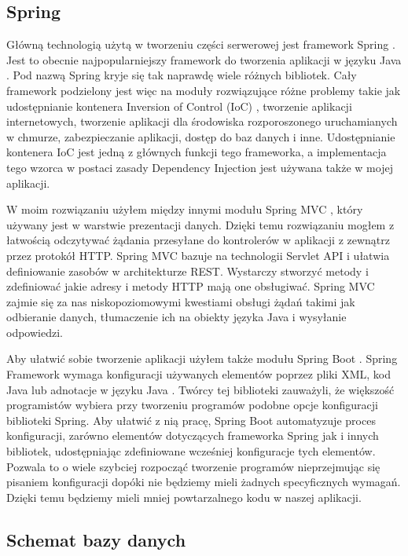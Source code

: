 \documentclass[shortabstract,inz]{iithesis}
\begin{document}
\subsection{Spring}
Główną technologią użytą w tworzeniu części serwerowej jest framework Spring \cite{spring}. Jest to obecnie najpopularniejszy framework do tworzenia aplikacji w języku Java \cite{spring-popularity}. Pod nazwą Spring kryje się tak naprawdę wiele różnych bibliotek. Cały framework podzielony jest więc na moduły rozwiązujące różne problemy \cite{spring-modules} takie jak udostępnianie kontenera Inversion of Control (IoC) \citep{ioc}, tworzenie aplikacji internetowych, tworzenie aplikacji dla środowiska rozporoszonego uruchamianych w chmurze, zabezpieczanie aplikacji, dostęp do baz danych i inne. Udostępnianie kontenera IoC jest jedną z głównych funkcji tego frameworka, a implementacja tego wzorca w postaci zasady Dependency Injection jest używana także w mojej aplikacji.

W moim rozwiązaniu użyłem między innymi modułu Spring MVC \cite{spring-mvc}, który używany jest w warstwie prezentacji danych. Dzięki temu rozwiązaniu mogłem z łatwością odczytywać żądania przesyłane do kontrolerów w aplikacji z zewnątrz przez protokół HTTP. Spring MVC bazuje na technologii Servlet API i ułatwia definiowanie zasobów w architekturze REST. Wystarczy stworzyć metody i zdefiniować jakie adresy i metody HTTP mają one obsługiwać. Spring MVC zajmie się za nas niskopoziomowymi kwestiami obsługi żądań takimi jak odbieranie danych, tłumaczenie ich na obiekty języka Java i wysyłanie odpowiedzi.

Aby ułatwić sobie tworzenie aplikacji użyłem także modułu Spring Boot \cite{spring-boot}. Spring Framework wymaga konfiguracji używanych elementów poprzez pliki XML, kod Java lub adnotacje w języku Java \citep{java-annotations}. Twórcy tej biblioteki zauważyli, że większość programistów wybiera przy tworzeniu programów podobne opcje konfiguracji biblioteki Spring. Aby ułatwić z nią pracę, Spring Boot automatyzuje proces konfiguracji, zarówno elementów dotyczących frameworka Spring jak i innych bibliotek, udostępniając zdefiniowane wcześniej konfiguracje tych elementów. Pozwala to o wiele szybciej rozpocząć tworzenie programów nieprzejmując się pisaniem konfiguracji dopóki nie będziemy mieli żadnych specyficznych wymagań. Dzięki temu będziemy mieli mniej powtarzalnego kodu w naszej aplikacji.
\subsection{Schemat bazy danych}
\end{document}
